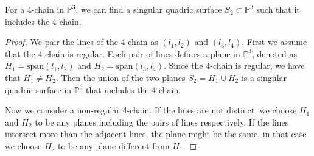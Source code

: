 \begin{proposition}\label{lem:2planes}
    For a 4-chain in $\mathbb{P}^3$, we can find a singular quadric surface $ S_2 \subset \mathbb{P}^3$ such that it includes the 4-chain.
\end{proposition}
\begin{proof}
    We pair the lines of the 4-chain as $(l_1, l_2)$ and $(l_3, l_4)$. First we assume that the 4-chain is regular. Each pair of lines defines a plane in $\mathbb{P}^3$, denoted as $H_1 = \mathrm{span}(l_1, l_2)$ and $H_2 = \mathrm{span}(l_3, l_4)$. Since the 4-chain is regular, we have that $H_1 \neq H_2$. Then the union of the two planes $S_2 = H_1 \cup H_2$ is a singular quadric surface in $\mathbb{P}^3$ that includes the 4-chain.

    Now we consider a non-regular 4-chain. If the lines are not distinct, we choose $H_1$ and $H_2$ to be any planes including the pairs of lines respectively. If the lines intersect more than the adjacent lines, the plane might be the same, in that case we choose $H_2$ to be any plane different from $H_1$.
\end{proof}








